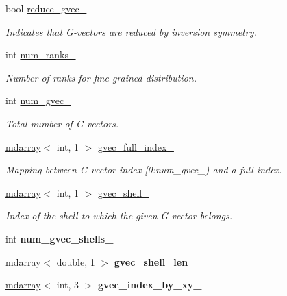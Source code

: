 \begin{DoxyCompactItemize}
bool \hyperlink{classsddk_1_1_gvec_aba6399c3e2408cde1168fb5e72e82b15}{reduce\+\_\+gvec\+\_\+}
\begin{DoxyCompactList}\small\item\em Indicates that G-\/vectors are reduced by inversion symmetry. \end{DoxyCompactList}\item 
int \hyperlink{classsddk_1_1_gvec_a54ae64b74a7dcfe6f82f9516be4fbc64}{num\+\_\+ranks\+\_\+}
\begin{DoxyCompactList}\small\item\em Number of ranks for fine-\/grained distribution. \end{DoxyCompactList}\item 
int \hyperlink{classsddk_1_1_gvec_ad376b1d40e9241a3bdfd227b8ce487fa}{num\+\_\+gvec\+\_\+}
\begin{DoxyCompactList}\small\item\em Total number of G-\/vectors. \end{DoxyCompactList}\item 
\hyperlink{classsddk_1_1mdarray}{mdarray}$<$ int, 1 $>$ \hyperlink{classsddk_1_1_gvec_a27b03be0abec2f40aadeb0400ebfbfa4}{gvec\+\_\+full\+\_\+index\+\_\+}
\begin{DoxyCompactList}\small\item\em Mapping between G-\/vector index \mbox{[}0\+:num\+\_\+gvec\+\_\+) and a full index. \end{DoxyCompactList}\item 
\hyperlink{classsddk_1_1mdarray}{mdarray}$<$ int, 1 $>$ \hyperlink{classsddk_1_1_gvec_adc60dc3bc088745caaa64fe58996e155}{gvec\+\_\+shell\+\_\+}
\begin{DoxyCompactList}\small\item\em Index of the shell to which the given G-\/vector belongs. \end{DoxyCompactList}\item 
\hypertarget{classsddk_1_1_gvec_ac9ea9f17ce196efec8dc38e912e0ce14}{}int {\bfseries num\+\_\+gvec\+\_\+shells\+\_\+}\label{classsddk_1_1_gvec_ac9ea9f17ce196efec8dc38e912e0ce14}

\item 
\hypertarget{classsddk_1_1_gvec_a4cda9b7e0f55b99d64aa7f1c33900620}{}\hyperlink{classsddk_1_1mdarray}{mdarray}$<$ double, 1 $>$ {\bfseries gvec\+\_\+shell\+\_\+len\+\_\+}\label{classsddk_1_1_gvec_a4cda9b7e0f55b99d64aa7f1c33900620}

\item 
\hypertarget{classsddk_1_1_gvec_a4f9ee2d49b26642fe5e92b5ff3199fef}{}\hyperlink{classsddk_1_1mdarray}{mdarray}$<$ int, 3 $>$ {\bfseries gvec\+\_\+index\+\_\+by\+\_\+xy\+\_\+}\label{classsddk_1_1_gvec_a4f9ee2d49b26642fe5e92b5ff3199fef}


\end{DoxyCompactItemize}
